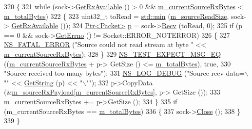 \begin{DoxyCode}
320 \{
321   \textcolor{keywordflow}{while} (sock->\hyperlink{classns3_1_1Socket_ad35d8931e53ae0754ee864acb1cecd0e}{GetRxAvailable} () > 0 && \hyperlink{classTcpTestCase_a955064e2af5b339a49a3aa3a04f166f8}{m\_currentSourceRxBytes} < 
      \hyperlink{classTcpTestCase_a9b4497e157a0b1fb7fdf90e833696201}{m\_totalBytes})
322     \{
323       uint32\_t toRead = \hyperlink{80211b_8c_ac6afabdc09a49a433ee19d8a9486056d}{std::min} (\hyperlink{classTcpTestCase_a9c310cf24127d169c4d40af57de54e3b}{m\_sourceReadSize}, sock->
      \hyperlink{classns3_1_1Socket_ad35d8931e53ae0754ee864acb1cecd0e}{GetRxAvailable} ());
324       \hyperlink{classns3_1_1Ptr}{Ptr<Packet>} \hyperlink{lte__link__budget_8m_ac9de518908a968428863f829398a4e62}{p} = sock->\hyperlink{classns3_1_1Socket_a8949b1f844aae563446f2f4c5be8827a}{Recv} (toRead, 0);
325       \textcolor{keywordflow}{if} (p == 0 && sock->\hyperlink{classns3_1_1Socket_ae489616249d946f3c0dc831c05d0d711}{GetErrno} () != Socket::ERROR\_NOTERROR)
326         \{
327           \hyperlink{group__fatal_ga5131d5e3f75d7d4cbfd706ac456fdc85}{NS\_FATAL\_ERROR} (\textcolor{stringliteral}{"Source could not read stream at byte "} << 
      \hyperlink{classTcpTestCase_a955064e2af5b339a49a3aa3a04f166f8}{m\_currentSourceRxBytes});
328         \}
329       \hyperlink{group__testing_ga7304ba46a28d8cf08dfdfd6499cf7068}{NS\_TEST\_EXPECT\_MSG\_EQ} ((\hyperlink{classTcpTestCase_a955064e2af5b339a49a3aa3a04f166f8}{m\_currentSourceRxBytes} + p->
      GetSize () <= \hyperlink{classTcpTestCase_a9b4497e157a0b1fb7fdf90e833696201}{m\_totalBytes}), \textcolor{keyword}{true},
330                              \textcolor{stringliteral}{"Source received too many bytes"});
331       \hyperlink{group__logging_ga413f1886406d49f59a6a0a89b77b4d0a}{NS\_LOG\_DEBUG} (\textcolor{stringliteral}{"Source recv data=\(\backslash\)""} << \hyperlink{tcp-test_8cc_ab9425fc2dc406843f955d1565b7fc804}{GetString} (p) << \textcolor{stringliteral}{"\(\backslash\)""});
332       p->CopyData (&\hyperlink{classTcpTestCase_ac6e1dba9cf4a200de57b4247d383bbf4}{m\_sourceRxPayload}[\hyperlink{classTcpTestCase_a955064e2af5b339a49a3aa3a04f166f8}{m\_currentSourceRxBytes}], p->
      GetSize ());
333       m\_currentSourceRxBytes += p->GetSize ();
334     \}
335   \textcolor{keywordflow}{if} (m\_currentSourceRxBytes == \hyperlink{classTcpTestCase_a9b4497e157a0b1fb7fdf90e833696201}{m\_totalBytes})
336     \{
337       sock->\hyperlink{classns3_1_1Socket_abdac6e2498c5aa2963ef361d4200ddf3}{Close} ();
338     \}
339 \}
\end{DoxyCode}


